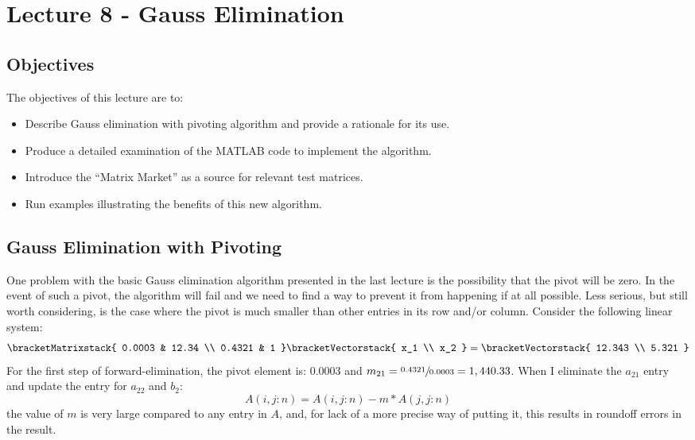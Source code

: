 \chapter{Lecture 8 - Gauss Elimination}
\label{ch:lec8n}
\section{Objectives}
The objectives of this lecture are to:
\begin{itemize}
\item Describe Gauss elimination with pivoting algorithm and provide a rationale for its use.
\item Produce a detailed examination of the MATLAB code to implement the algorithm.
\item Introduce the ``Matrix Market'' as a source for relevant test matrices.
\item Run examples illustrating the benefits of this new algorithm.
\end{itemize}
\setcounter{lstannotation}{0}

\section{Gauss Elimination with Pivoting}

One problem with the basic Gauss elimination algorithm presented in the last lecture is the possibility that the pivot will be zero.  In the event of such a pivot, the algorithm will fail and we need to find a way to prevent it from happening if at all possible.  Less serious, but still worth considering, is the case where the pivot is much smaller than other entries in its row and/or column.  Consider the following linear system:
\begin{equation*}
\bracketMatrixstack{
0.0003 & 12.34 \\
0.4321 & 1 
}
\bracketVectorstack{
x_1 \\
x_2
}
=
\bracketVectorstack{
12.343 \\
5.321
}
\end{equation*}   
For the first step of forward-elimination, the pivot element is: 0.0003 and $m_{21} = \sfrac{0.4321}{0.0003} = 1,440.33$.  When I eliminate the $a_{21}$ entry and update the entry for $a_{22}$ and $b_2$:
\begin{equation*}
A(i,j:n) = A(i,j:n) - m*A(j,j:n)
\end{equation*}
the value of $m$ is very large compared to any entry in $A$, and, for lack of a more precise way of putting it, this results in roundoff errors in the result. 

